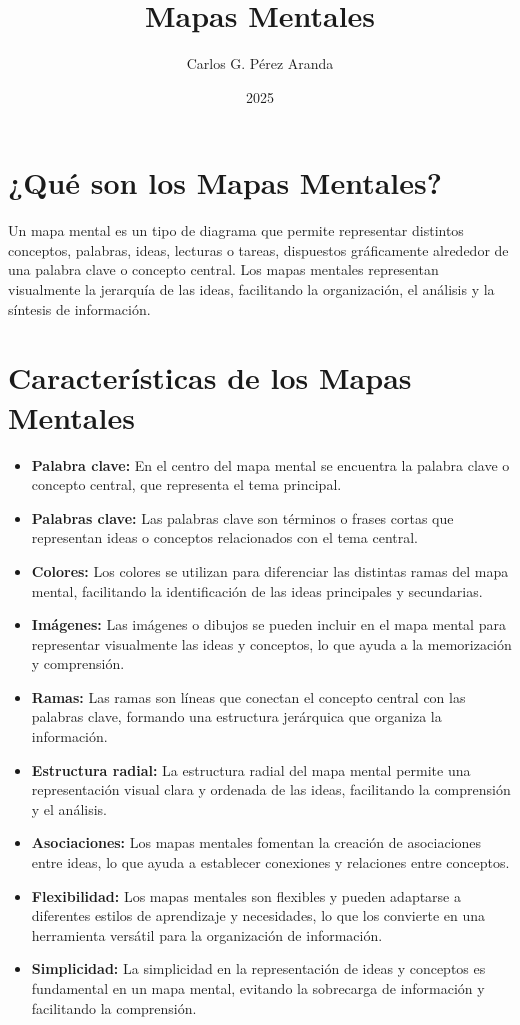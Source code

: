\documentclass[12pt, a4paper, twoside]{article}
\title{Mapas Mentales}
\author{Carlos G. Pérez Aranda}
\date{2025}
\begin{document}
\maketitle
\section{¿Qué son los Mapas Mentales?}
Un mapa mental es un tipo de diagrama que permite representar distintos conceptos,
 palabras, ideas, lecturas o tareas, dispuestos gráficamente alrededor de una 
 palabra clave o concepto central. Los mapas mentales representan visualmente 
 la jerarquía de las ideas, facilitando la organización, el análisis y la síntesis 
 de información.

 \section{Características de los Mapas Mentales}
 \begin{itemize}
    \item \textbf{Palabra clave:} En el centro del mapa mental se encuentra la palabra clave o concepto central, que representa el tema principal.
    \item \textbf{Palabras clave:} Las palabras clave son términos o frases cortas que representan ideas o conceptos relacionados con el tema central.
    \item \textbf{Colores:} Los colores se utilizan para diferenciar las distintas ramas del mapa mental, facilitando la identificación de las ideas principales y secundarias.
    \item \textbf{Imágenes:} Las imágenes o dibujos se pueden incluir en el mapa mental para representar visualmente las ideas y conceptos, lo que ayuda a la memorización y comprensión.
    \item \textbf{Ramas:} Las ramas son líneas que conectan el concepto central con las palabras clave, formando una estructura jerárquica que organiza la información.
    \item \textbf{Estructura radial:} La estructura radial del mapa mental permite una representación visual clara y ordenada de las ideas, facilitando la comprensión y el análisis.
    \item \textbf{Asociaciones:} Los mapas mentales fomentan la creación de asociaciones entre ideas, lo que ayuda a establecer conexiones y relaciones entre conceptos.
    \item \textbf{Flexibilidad:} Los mapas mentales son flexibles y pueden adaptarse a diferentes estilos de aprendizaje y necesidades, lo que los convierte en una herramienta versátil para la organización de información.
    \item \textbf{Simplicidad:} La simplicidad en la representación de ideas y conceptos es fundamental en un mapa mental, evitando la sobrecarga de información y facilitando la comprensión.
 \end{itemize}
\end{document}
